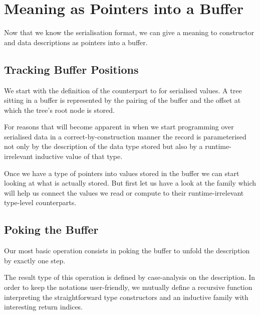 \section{Meaning as Pointers into a Buffer}\label{sec:pointers}

Now that we know the serialisation format, we can give a meaning
to constructor and data descriptions as pointers into a buffer.

\subsection{Tracking Buffer Positions}

We start with the definition of the counterpart to 
for serialised values. A tree sitting in a buffer is represented
by the pairing of the buffer and the offset at which the tree's
root node is stored.


For reasons that will become apparent in 
when we start programming over serialised data in a correct-by-construction
manner the record  is parameterised not only by the description
of the data type stored but also by a runtime-irrelevant inductive value of
that type.


Once we have a type of pointers into values stored in the buffer
we can start looking at what is actually stored.
%
But first let us have a look at the  family
which will help us connect the values we read or compute to their
runtime-irrelevant type-level counterparts.



\subsection{Poking the Buffer}

Our most basic operation consists in poking the buffer to unfold
the description by exactly one step.


The result type of this operation is defined by case-analysis on the
description. In order to keep the notations user-friendly, we
mutually define
a recursive function  interpreting the straightforward type constructors
and an inductive family  with interesting return indices.

